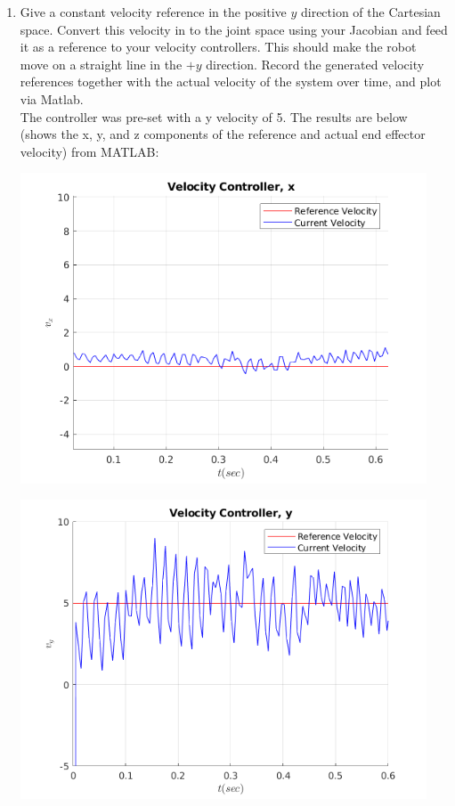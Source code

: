 \documentclass[10pt]{article}
\begin{document}
\begin{enumerate}
	\item Give a constant velocity reference in the positive $y$ direction of the Cartesian space. Convert this velocity in to the joint space using your Jacobian and feed it as a reference to your velocity controllers. This should make the robot move on a straight line in the $+y$ direction. Record the generated velocity references together with the actual velocity of the system over time, and plot via Matlab.
	\\
	
	The controller was pre-set with a y velocity of 5. The results are below (shows the x, y, and z components of the reference and actual end effector velocity) from MATLAB:
	
	\begin{minipage}[H]{0.45\textwidth}
		\centering
		\includegraphics[width=0.95\textwidth]{figures/vel-vx-plot1.png}
	\end{minipage}
	\begin{minipage}[H]{0.45\textwidth}
		\centering
		\includegraphics[width=0.95\textwidth]{figures/vel-vy-plot1.png}
	\end{minipage}
	

\end{enumerate}
\end{document}

